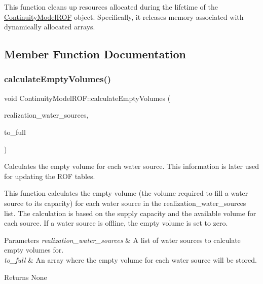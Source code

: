 This function cleans up resources allocated during the lifetime of the \mbox{\hyperlink{classContinuityModelROF}{Continuity\+Model\+R\+OF}} object. Specifically, it releases memory associated with dynamically allocated arrays. 

\subsection{Member Function Documentation}
\mbox{\label{classContinuityModelROF_aa720006d12410fc35b8768eda716c149}} 
\subsubsection{\texorpdfstring{calculate\+Empty\+Volumes()}{calculateEmptyVolumes()}}
{\footnotesize\ttfamily void Continuity\+Model\+R\+O\+F\+::calculate\+Empty\+Volumes (\begin{DoxyParamCaption}\item[{vector$<$ \mbox{\hyperlink{classWaterSource}{Water\+Source}} $\ast$$>$ \&}]{realization\+\_\+water\+\_\+sources,  }\item[{double $\ast$}]{to\+\_\+full }\end{DoxyParamCaption})}



Calculates the empty volume for each water source. This information is later used for updating the R\+OF tables. 

This function calculates the empty volume (the volume required to fill a water source to its capacity) for each water source in the {\ttfamily realization\+\_\+water\+\_\+sources} list. The calculation is based on the supply capacity and the available volume for each source. If a water source is offline, the empty volume is set to zero.


\begin{DoxyParams}{Parameters}
{\em realization\+\_\+water\+\_\+sources} & A list of water sources to calculate empty volumes for. \\
\hline
{\em to\+\_\+full} & An array where the empty volume for each water source will be stored.\\
\hline
\end{DoxyParams}
\begin{DoxyReturn}{Returns}
None 
\end{DoxyReturn}
\mbox{\label{classContinuityModelROF_a0b66880fe153cbd0b85a5b416b98e9a6}} 
